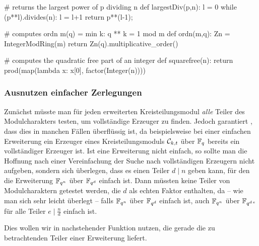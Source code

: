 \begin{sagecode}[caption={[\texttt{largestDiv} aus 
 \url{../Sage/enumeratePCNs.spyx}]Aus \url{../Sage/enumeratePCNs.spyx}}]
# returns the largest power of p dividing n
def largestDiv(p,n):
    l = 0
    while (p**l).divides(n):
        l = l+1
    return p**(l-1);
\end{sagecode}


\begin{sagecode}[caption={[\texttt{ordn} aus 
 \url{../Sage/enumeratePCNs.spyx}]Aus \url{../Sage/enumeratePCNs.spyx}}]
# computes ordn m(q) = min{ k: q ** k = 1 mod m }
def ordn(m,q):
    Zn = IntegerModRing(m)
    return Zn(q).multiplicative_order()
\end{sagecode}  

\begin{sagecode}[caption={[\texttt{squarefree} aus 
 \url{../Sage/enumeratePCNs.spyx}]Aus \url{../Sage/enumeratePCNs.spyx}}]
# computes the quadratic free part of an integer
def squarefree(n):
    return prod(map(lambda x: x[0], factor(Integer(n))))
\end{sagecode}  


\subsubsection{Ausnutzen einfacher Zerlegungen}

Zunächst müsste man für jeden erweiterten Kreisteilungsmodul
\emph{alle} Teiler des Modulcharakters testen, um vollständige Erzeuger zu
finden. Jedoch garantiert , dass dies in
manchen Fällen überflüssig ist, da beispielsweise bei 
einer einfachen Erweiterung ein Erzeuger
eines Kreisteilungsmoduls $\mathcal{C}_{k,t}$ über $\mathbb{F}_q$ bereits ein vollständiger
Erzeuger ist. Ist eine Erweiterung nicht einfach, so sollte man die Hoffnung
nach einer Vereinfachung der Suche nach vollständigen Erzeugern nicht aufgeben,
sondern sich überlegen, dass es einen Teiler $d \mid n$ geben kann, für den
die Erweiterung $\mathbb{F}_{q^n}$ über $\mathbb{F}_{q^d}$ einfach ist. Dann müssten keine
Teiler von Modulcharaktern getestet werden, die $d$ als echten Faktor
enthalten, da -- wie man sich sehr leicht überlegt -- 
falls $\mathbb{F}_{q^n}$ über $\mathbb{F}_{q^d}$ einfach
ist, auch $\mathbb{F}_{q^n}$ über $\mathbb{F}_{q^{d\,e}}$ für alle
Teiler $e \mid \tfrac n d$ einfach ist.

Dies wollen wir in nachstehender Funktion nutzen, die
gerade die zu betrachtenden Teiler einer Erweiterung liefert.

